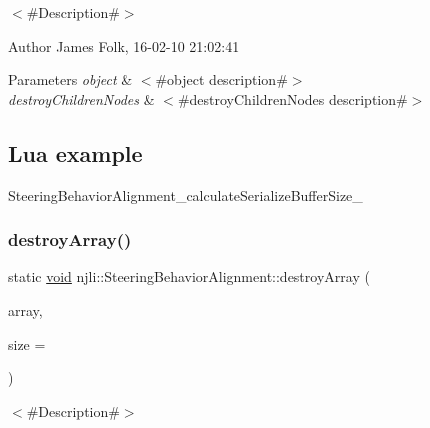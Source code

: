 $<$\#\+Description\#$>$ 

\begin{DoxyAuthor}{Author}
James Folk, 16-\/02-\/10 21\+:02\+:41
\end{DoxyAuthor}

\begin{DoxyParams}{Parameters}
{\em object} & $<$\#object description\#$>$ \\
\hline
{\em destroy\+Children\+Nodes} & $<$\#destroy\+Children\+Nodes description\#$>$\\
\hline
\end{DoxyParams}
\hypertarget{classnjli_1_1_steering_behavior_wander_ex1}{}\subsection{Lua example}\label{classnjli_1_1_steering_behavior_wander_ex1}

\begin{DoxyCodeInclude}
\end{DoxyCodeInclude}
Steering\+Behavior\+Alignment\+\_\+calculate\+Serialize\+Buffer\+Size\+\_\+ \mbox{\label{classnjli_1_1_steering_behavior_alignment_aaa4572d52e3e9b2c3c792dbbe061e2fb}} 
\subsubsection{\texorpdfstring{destroy\+Array()}{destroyArray()}}
{\footnotesize\ttfamily static \mbox{\hyperlink{_thread_8h_af1e856da2e658414cb2456cb6f7ebc66}{void}} njli\+::\+Steering\+Behavior\+Alignment\+::destroy\+Array (\begin{DoxyParamCaption}\item[{\mbox{\hyperlink{classnjli_1_1_steering_behavior_alignment}{Steering\+Behavior\+Alignment}} $\ast$$\ast$}]{array,  }\item[{const \mbox{\hyperlink{_util_8h_a10e94b422ef0c20dcdec20d31a1f5049}{u32}}}]{size = {} }\end{DoxyParamCaption})\hspace{0.3cm}{\ttfamily [static]}}



$<$\#\+Description\#$>$ 

